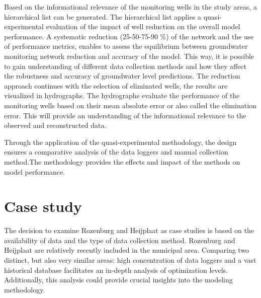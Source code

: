 Based on the informational relevance of the monitoring wells in the study areas, a hierarchical list can be generated. The hierarchical list applies a quasi-experimental evaluation of the impact of well reduction on the overall model performance. A systematic reduction (25-50-75-90 \%) of the network and the use of performance metrics, enables to assess the equilibrium between groundwater monitoring network reduction and accuracy of the model. This way, it is possible to gain understanding of different data collection methods and how they affect the robustness and accuracy of groundwater level predictions. The reduction approach continues with the selection of eliminated wells, the results are visualized in hydrographs. The hydrographs evaluate the performance of the monitoring wells based on their mean absolute error or also called the elimination error. This will provide an understanding of the informational relevance to the observed and reconstructed data. 

Through the application of the quasi-experimental methodology, the design ensures a comparative analysis of the data loggers and manual collection method.The methodology provides the effects and impact of the methods on model performance. 

\section{Case study}
The decision to examine Rozenburg and Heijplaat as case studies is based on the availability of data and the type of data collection method. Rozenburg and Heijplaat are relatively recently included in the municipal area. Comparing two distinct, but also very similar areas: high concentration of data loggers and a vast historical database facilitates an in-depth analysis of optimization levels. Additionally, this analysis could provide crucial insights into the modeling methodology.\\
\\
